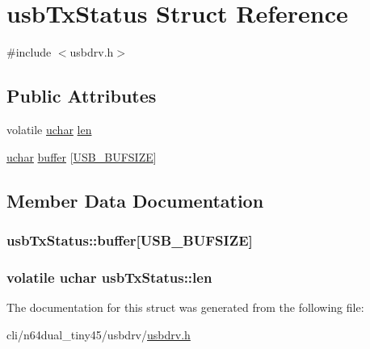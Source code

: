 \hypertarget{structusbTxStatus}{\section{usb\-Tx\-Status Struct Reference}
\label{structusbTxStatus}
}


{\ttfamily \#include $<$usbdrv.\-h$>$}

\subsection*{Public Attributes}
\begin{DoxyCompactItemize}
\item 
volatile \hyperlink{usbdrv_8h_aa8ddf20cdd716b652e76e23e5e700893}{uchar} \hyperlink{structusbTxStatus_a3ee6d00644cd8bb758bffffed53022b6}{len}
\item 
\hyperlink{usbdrv_8h_aa8ddf20cdd716b652e76e23e5e700893}{uchar} \hyperlink{structusbTxStatus_ac0cd1cbb98d720cd1f6b458e5dca8b74}{buffer} \mbox{[}\hyperlink{usbdrv_8h_a1c541dbab181ea7bd3da61b892430988}{U\-S\-B\-\_\-\-B\-U\-F\-S\-I\-Z\-E}\mbox{]}
\end{DoxyCompactItemize}


\subsection{Member Data Documentation}
\hypertarget{structusbTxStatus_ac0cd1cbb98d720cd1f6b458e5dca8b74}{
\subsubsection[{buffer}]{ usb\-Tx\-Status\-::buffer\mbox{[}{\bf U\-S\-B\-\_\-\-B\-U\-F\-S\-I\-Z\-E}\mbox{]}}}\label{structusbTxStatus_ac0cd1cbb98d720cd1f6b458e5dca8b74}
\hypertarget{structusbTxStatus_a3ee6d00644cd8bb758bffffed53022b6}{
\subsubsection[{len}]{\setlength{\rightskip}{0pt plus 5cm}volatile {\bf uchar} usb\-Tx\-Status\-::len}}\label{structusbTxStatus_a3ee6d00644cd8bb758bffffed53022b6}


The documentation for this struct was generated from the following file\-:\begin{DoxyCompactItemize}
\item 
cli/n64dual\-\_\-tiny45/usbdrv/\hyperlink{usbdrv_8h}{usbdrv.\-h}\end{DoxyCompactItemize}
